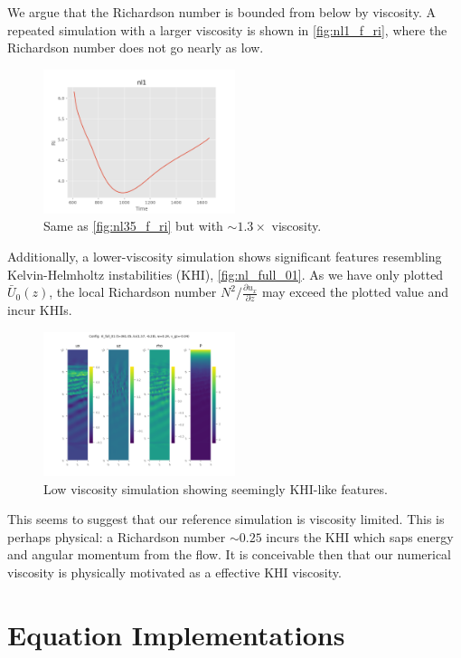 \documentclass[twocolumn,
        nofootinbib,
        usenames, %
        dvipsnames %
    ]{revtex4-1}%
\newcommand*{\pd}[2]{\frac{\partial#1}{\partial#2}}
\begin{document}
We argue that the Richardson number is bounded from below by viscosity. A
repeated simulation with a larger viscosity is shown in \autoref{fig:nl1_f_ri},
where the Richardson number does not go nearly as low.
\begin{figure}[h]
    \centering
    \includegraphics[width=0.5\textwidth]{plots/nl1_f_ri.png}
    \caption{Same as \autoref{fig:nl35_f_ri} but with $\sim 1.3\times$
    viscosity.}\label{fig:nl1_f_ri}
\end{figure}

Additionally, a lower-viscosity simulation shows significant features resembling
Kelvin-Helmholtz instabilities (KHI), \autoref{fig:nl_full_01}. As we have only
plotted $\bar{U}_0(z)$, the local Richardson number $N^2 / \pd{u_x}{z}$ may
exceed the plotted value and incur KHIs.
\begin{figure}[h]
    \centering
    \includegraphics[width=0.5\textwidth]{plots/nl_full_01.png}
    \caption{Low viscosity simulation showing seemingly KHI-like
    features.}\label{fig:nl_full_01}
\end{figure}

This seems to suggest that our reference simulation is viscosity limited. This
is perhaps physical: a Richardson number $\sim 0.25$ incurs the KHI which saps
energy and angular momentum from the flow. It is conceivable then that our
numerical viscosity is physically motivated as a effective KHI viscosity.

\clearpage
\onecolumngrid
\appendix

\section{Equation Implementations}\label{ss:strat_impl}
\end{document}
